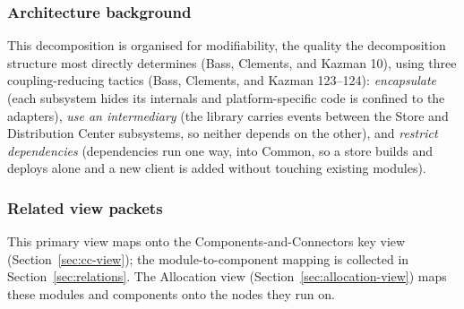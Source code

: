\subsubsection{Architecture background}
This decomposition is organised for modifiability, the quality the decomposition structure
most directly determines (Bass, Clements, and Kazman 10), using three coupling-reducing
tactics (Bass, Clements, and Kazman 123--124): \emph{encapsulate} (each subsystem hides
its internals and platform-specific code is confined to the adapters), \emph{use an
intermediary} (the \IEP library carries events between the Store and Distribution Center
subsystems, so neither depends on the other), and \emph{restrict dependencies}
(dependencies run one way, into Common, so a store builds and deploys alone and a new
client is added without touching existing modules).

\subsubsection{Related view packets}
This primary view maps onto the Components-and-Connectors key view
(Section~\ref{sec:cc-view}); the module-to-component mapping is collected in
Section~\ref{sec:relations}. The Allocation view (Section~\ref{sec:allocation-view}) maps
these modules and components onto the nodes they run on.
\endgroup
